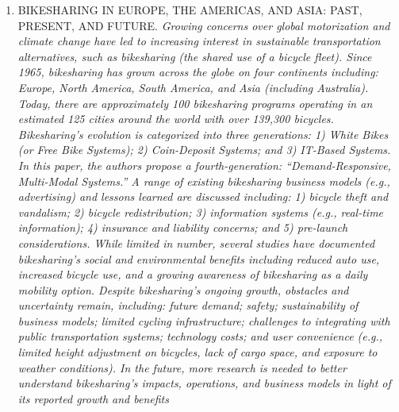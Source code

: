 \begin{enumerate}
\item BIKESHARING IN EUROPE, THE AMERICAS, AND ASIA:
PAST, PRESENT, AND FUTURE.
\small\textit{Growing concerns over global motorization and climate change have led to increasing interest in
sustainable transportation alternatives, such as bikesharing (the shared use of a bicycle fleet).
Since 1965, bikesharing has grown across the globe on four continents including: Europe, North
America, South America, and Asia (including Australia). Today, there are approximately 100
bikesharing programs operating in an estimated 125 cities around the world with over 139,300
bicycles. Bikesharing’s evolution is categorized into three generations: 1) White Bikes (or Free
Bike Systems); 2) Coin-Deposit Systems; and 3) IT-Based Systems. In this paper, the authors
propose a fourth-generation: “Demand-Responsive, Multi-Modal Systems.” A range of existing
bikesharing business models (e.g., advertising) and lessons learned are discussed including: 1)
bicycle theft and vandalism; 2) bicycle redistribution; 3) information systems (e.g., real-time
information); 4) insurance and liability concerns; and 5) pre-launch considerations. While limited
in number, several studies have documented bikesharing’s social and environmental benefits
including reduced auto use, increased bicycle use, and a growing awareness of bikesharing as a
daily mobility option. Despite bikesharing’s ongoing growth, obstacles and uncertainty remain,
including: future demand; safety; sustainability of business models; limited cycling
infrastructure; challenges to integrating with public transportation systems; technology costs; and
user convenience (e.g., limited height adjustment on bicycles, lack of cargo space, and exposure
to weather conditions). In the future, more research is needed to better understand bikesharing’s
impacts, operations, and business models in light of its reported growth and benefits}


\end{enumerate}

